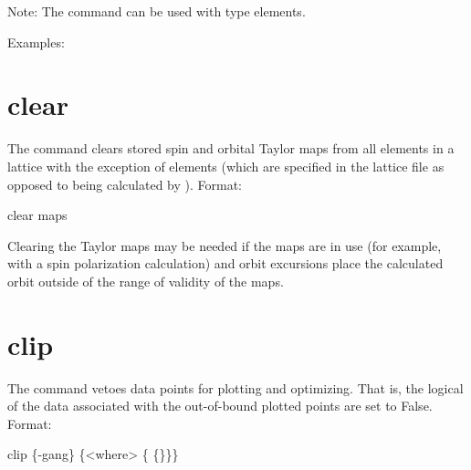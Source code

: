 Note: The  command can be used with  type elements.

Examples:


\section{clear}
\label{s:clear}

The  command clears stored spin and orbital Taylor maps from all elements in a lattice
with the exception of  elements (which are specified in the lattice file as opposed to
being calculated by \bmad). Format:
\begin{example}
  clear maps
\end{example}

Clearing the Taylor maps may be needed if the maps are in use (for example, with a spin polarization
calculation) and orbit excursions place the calculated orbit outside of the range of validity of the
maps.

\section{clip}
\label{s:clip}

The  command vetoes data points for plotting and optimizing. That is, the 
logical of the data associated with the out-of-bound plotted points are set to False.  Format:
\begin{example}
  clip \{-gang\} \{<where> \{<limit1> \{<limit2>\}\}\}
\end{example}

